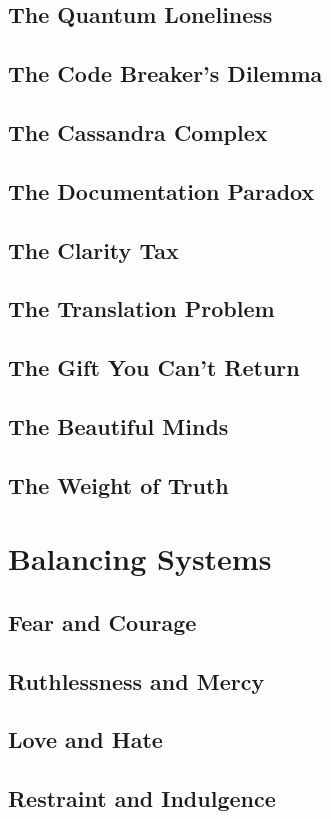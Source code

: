 \documentclass[12pt]{book}
\begin{document}
\chapter{The Quantum Loneliness}
\chapter{The Code Breaker's Dilemma}
\chapter{The Cassandra Complex}
\chapter{The Documentation Paradox}
\chapter{The Clarity Tax}
\chapter{The Translation Problem}
\chapter{The Gift You Can't Return}
\chapter{The Beautiful Minds}
\chapter{The Weight of Truth}

\part{Balancing Systems}
\chapter{Fear and Courage}
\chapter{Ruthlessness and Mercy}
\chapter{Love and Hate}
\chapter{Restraint and Indulgence}
\end{document}
